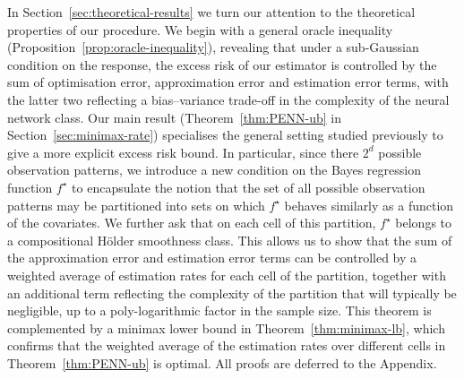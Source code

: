\documentclass[12pt]{article}
\begin{document}
In Section~\ref{sec:theoretical-results} we turn our attention to the theoretical properties of our procedure.  We begin with a general oracle inequality (Proposition~\ref{prop:oracle-inequality}), revealing that under a sub-Gaussian condition on the response, the excess risk of our estimator is controlled by the sum of optimisation error, approximation error and estimation error terms, with the latter two reflecting a bias--variance trade-off in the complexity of the neural network class.   
Our main result (Theorem~\ref{thm:PENN-ub} in Section~\ref{sec:minimax-rate}) specialises the general setting studied previously to give a more explicit excess risk bound.  In particular, since there $2^d$ possible observation patterns, we introduce a new condition on the Bayes regression function $f^\star$ to encapsulate the notion that the set of all possible observation patterns may be partitioned into sets on which $f^\star$ behaves similarly as a function of the covariates.  We further ask that on each cell of this partition, $f^\star$ belongs to a compositional H\"older smoothness class.  This allows us to show that the sum of the approximation error and estimation error terms can be controlled by a weighted average of estimation rates for each cell of the partition, together with an additional term reflecting the complexity of the partition that will typically be negligible, up to a poly-logarithmic factor in the sample size. This theorem is complemented by a minimax lower bound in Theorem~\ref{thm:minimax-lb}, which confirms that the weighted average of the estimation rates over different cells in Theorem~\ref{thm:PENN-ub} is optimal.  All proofs are deferred to the Appendix.
\end{document}

